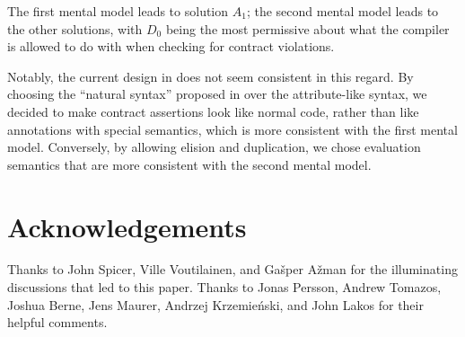 The first mental model leads to solution $A_1$; the second mental model leads to the other solutions, with $D_0$ being the most permissive about what the compiler is allowed to do with  when checking for contract violations.

Notably, the current design in \cite{P2900R6} does not seem consistent in this regard. By choosing the ``natural syntax'' proposed in \cite{P2961R2} over the attribute-like syntax, we decided to make contract assertions look like normal code, rather than like annotations with special semantics, which is more consistent with the first mental model. Conversely, by allowing elision and duplication, we chose evaluation semantics that are more consistent with the second mental model.



\section*{Acknowledgements}
Thanks to John Spicer, Ville Voutilainen, and Ga\v sper A\v zman for the illuminating discussions that led to this paper. Thanks to Jonas Persson, Andrew Tomazos, Joshua Berne, Jens Maurer, Andrzej Krzemie\' nski, and John Lakos for their helpful comments.


\renewcommand{\bibname}{References}






